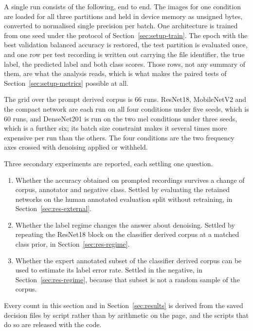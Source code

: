 A single run consists of the following, end to end. The images for one condition are
loaded for all three partitions and held in device memory as unsigned bytes, converted to
normalised single precision per batch. One architecture is trained from one seed under
the protocol of Section~\ref{sec:setup-train}. The epoch with the best validation
balanced accuracy is restored, the test partition is evaluated once, and one row per test
recording is written out carrying the file identifier, the true label, the predicted
label and both class scores. Those rows, not any summary of them, are what the analysis
reads, which is what makes the paired tests of Section~\ref{sec:setup-metrics} possible
at all.

The grid over the prompt derived corpus is $66$ runs. ResNet18, MobileNetV2 and the
compact network are each run on all four conditions under five seeds, which is $60$ runs,
and DenseNet201 is run on the two mel conditions under three seeds, which is a further
six; its batch size constraint makes it several times more expensive per run than the
others. The four conditions are the two frequency axes crossed with denoising applied or
withheld.

Three secondary experiments are reported, each settling one question.
\begin{enumerate}
\item Whether the accuracy obtained on prompted recordings survives a change of corpus,
      annotator and negative class. Settled by evaluating the retained networks on the
      human annotated evaluation split without retraining, in
      Section~\ref{sec:res-external}.
\item Whether the label regime changes the answer about denoising. Settled by repeating
      the ResNet18 block on the classifier derived corpus at a matched class prior, in
      Section~\ref{sec:res-regime}.
\item Whether the expert annotated subset of the classifier derived corpus can be used to
      estimate its label error rate. Settled in the negative, in
      Section~\ref{sec:res-regime}, because that subset is not a random sample of the
      corpus.
\end{enumerate}

Every count in this section and in Section~\ref{sec:results} is derived from the saved
decision files by script rather than by arithmetic on the page, and the scripts that do
so are released with the code.

